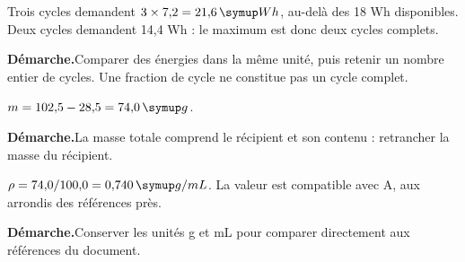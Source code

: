 \par\noindent\begin{minipage}{\linewidth}Trois cycles demandent $3\times7{,}2=21{,}6\unite{Wh}$, au-delà des 18 Wh disponibles. Deux cycles demandent 14,4 Wh : le maximum est donc deux cycles complets.\par\smallskip\textbf{Démarche.}\enspace Comparer des énergies dans la même unité, puis retenir un nombre entier de cycles. Une fraction de cycle ne constitue pas un cycle complet.\par{}\end{minipage}\par
{}
\par\noindent\begin{minipage}{\linewidth}$m=102{,}5-28{,}5=74{,}0\unite g$.\par\smallskip\textbf{Démarche.}\enspace La masse totale comprend le récipient et son contenu : retrancher la masse du récipient.\par{}\end{minipage}\par
\par\noindent\begin{minipage}{\linewidth}$\rho=74{,}0/100{,}0=0{,}740\unite{g/mL}$. La valeur est compatible avec A, aux arrondis des références près.\par\smallskip\textbf{Démarche.}\enspace Conserver les unités g et mL pour comparer directement aux références du document.\par{}\end{minipage}\par
